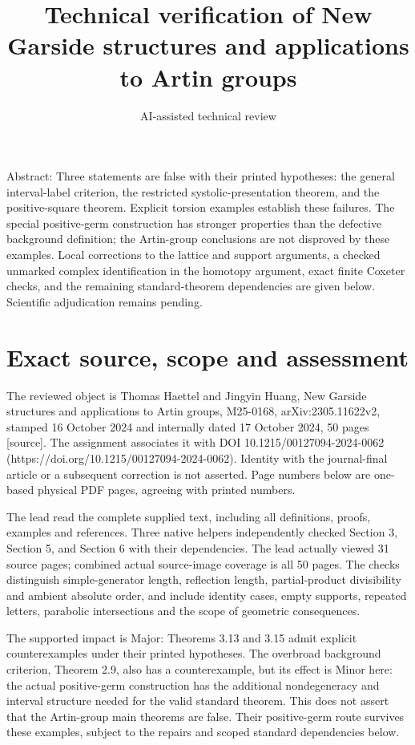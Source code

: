 \documentclass[10pt]{article}
\title{Technical verification of New Garside structures and applications to Artin groups}
\author{AI-assisted technical review}
\date{}
\begin{document}
\maketitle
Abstract: Three statements are false with their printed hypotheses: the general interval-label criterion, the restricted systolic-presentation theorem, and the positive-square theorem. Explicit torsion examples establish these failures. The special positive-germ construction has stronger properties than the defective background definition; the Artin-group conclusions are not disproved by these examples. Local corrections to the lattice and support arguments, a checked unmarked complex identification in the homotopy argument, exact finite Coxeter checks, and the remaining standard-theorem dependencies are given below. Scientific adjudication remains pending.\par
\section*{Exact source, scope and assessment}
The reviewed object is Thomas Haettel and Jingyin Huang, New Garside structures and applications to Artin groups, M25-0168, arXiv:2305.11622v2, stamped 16 October 2024 and internally dated 17 October 2024, 50 pages [source]. The assignment associates it with DOI 10.1215/00127094-2024-0062 (https://doi.org/10.1215/00127094-2024-0062). Identity with the journal-final article or a subsequent correction is not asserted. Page numbers below are one-based physical PDF pages, agreeing with printed numbers.\par
The lead read the complete supplied text, including all definitions, proofs, examples and references. Three native helpers independently checked Section 3, Section 5, and Section 6 with their dependencies. The lead actually viewed 31 source pages; combined actual source-image coverage is all 50 pages. The checks distinguish simple-generator length, reflection length, partial-product divisibility and ambient absolute order, and include identity cases, empty supports, repeated letters, parabolic intersections and the scope of geometric consequences.\par
The supported impact is Major: Theorems 3.13 and 3.15 admit explicit counterexamples under their printed hypotheses. The overbroad background criterion, Theorem 2.9, also has a counterexample, but its effect is Minor here: the actual positive-germ construction has the additional nondegeneracy and interval structure needed for the valid standard theorem. This does not assert that the Artin-group main theorems are false. Their positive-germ route survives these examples, subject to the repairs and scoped standard dependencies below.\par
\end{document}

